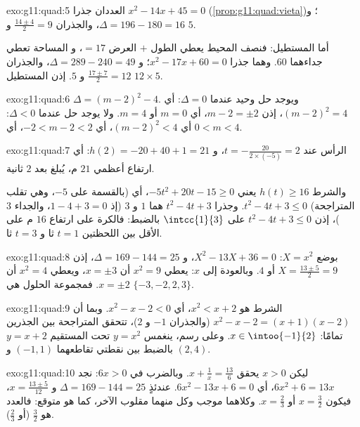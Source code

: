 \begin{solution}{exo:g11:quad:5}
العددان جذرا $x^2 - 14x + 45 = 0$ (\cref{prop:g11:quad:vieta})؛
و $\Delta = 196 - 180 = 16$، والجذران $\frac{14 \pm 4}{2} = 9$ و $5$.

أما المستطيل: فنصف المحيط يعطي الطول $+$ العرض $= 17$، و
المساحة تعطي جداءهما $60$. وهما جذرا $x^2 - 17x + 60 = 0$؛
و $\Delta = 289 - 240 = 49$، والجذران $\frac{17 \pm 7}{2} = 12$ و $5$. إذن
المستطيل $12 \times 5$.
\end{solution}

\begin{solution}{exo:g11:quad:6}
$\Delta = (m-2)^2 - 4$. ويوجد حل وحيد عندما $\Delta = 0$:
أي $(m-2)^2 = 4$، إذن $m - 2 = \pm 2$، أي $m = 0$ أو $m = 4$. ولا يوجد حل
عندما $\Delta < 0$: أي $(m-2)^2 < 4$، أي $-2 < m - 2 < 2$، أي
$0 < m < 4$.
\end{solution}

\begin{solution}{exo:g11:quad:7}
الرأس عند $t = -\frac{20}{2 \times (-5)} = 2$، و
$h(2) = -20 + 40 + 1 = 21$: أي ارتفاع أعظمي $21$ م، يُبلغ بعد $2$
ثانية.

والشرط $h(t) \geq 16$ يعني $-5t^2 + 20t - 15 \geq 0$، أي (بالقسمة على $-5$،
وهي تقلب المتراجحة) $t^2 - 4t + 3 \leq 0$. وجذرا
$t^2-4t+3$ هما $1$ و $3$ (إذ $1 - 4 + 3 = 0$، والجداء $3$)، إذن
$t^2 - 4t + 3 \leq 0$ على $\intcc{1}{3}$ بالضبط: فالكرة على ارتفاع
$16$ م على الأقل بين اللحظتين $t = 1$ ثا و $t = 3$ ثا.
\end{solution}

\begin{solution}{exo:g11:quad:8}
بوضع $X = x^2$: $X^2 - 13X + 36 = 0$، و $\Delta = 169 - 144 = 25$، إذن
$X = \frac{13 \pm 5}{2} = 9$ أو $4$. وبالعودة إلى $x$: يعطي $x^2 = 9$ أن
$x = \pm 3$، ويعطي $x^2 = 4$ أن $x = \pm 2$. فمجموعة الحلول هي
$\{-3, -2, 2, 3\}$.
\end{solution}

\begin{solution}{exo:g11:quad:9}
الشرط هو $x^2 < x + 2$، أي $x^2 - x - 2 < 0$. وبما أن
$x^2 - x - 2 = (x+1)(x-2)$ (والجذران $-1$ و $2$)، تتحقق المتراجحة
بين الجذرين تمامًا: $x \in \intoo{-1}{2}$. وعلى رسم، ينغمس
 $y = x^2$ تحت المستقيم $y = x+2$ بالضبط بين نقطتي
تقاطعهما $(-1, 1)$ و $(2, 4)$.
\end{solution}

\begin{solution}{exo:g11:quad:10}
ليكن $x > 0$ يحقق $x + \frac1x = \frac{13}{6}$. وبالضرب في $6x > 0$:
نجد $6x^2 + 6 = 13x$، أي $6x^2 - 13x + 6 = 0$. عندئذٍ
$\Delta = 169 - 144 = 25$ و $x = \frac{13 \pm 5}{12}$، فيكون
$x = \frac32$ أو $x = \frac23$. وكلاهما موجب وكل منهما مقلوب
الآخر، كما هو متوقع: فالعدد هو $\frac32$ (أو $\frac23$).
\end{solution}

